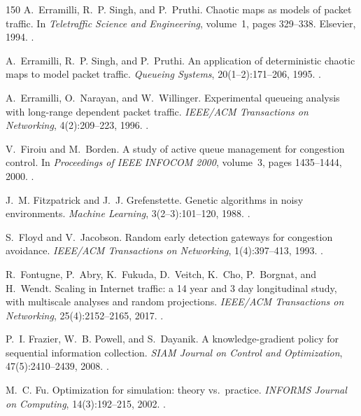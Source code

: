 \begin{thebibliography}{150}
A.~Erramilli, R.~P. Singh, and P.~Pruthi. Chaotic maps as models of packet traffic. In \emph{Teletraffic Science and Engineering}, volume~1, pages 329--338. Elsevier, 1994. .

A.~Erramilli, R.~P. Singh, and P.~Pruthi. An application of deterministic chaotic maps to model packet traffic. \emph{Queueing Systems}, 20(1--2):171--206, 1995. .

A.~Erramilli, O.~Narayan, and W.~Willinger. Experimental queueing analysis with long-range dependent packet traffic. \emph{IEEE/ACM Transactions on Networking}, 4(2):209--223, 1996. .

V.~Firoiu and M.~Borden. A study of active queue management for congestion control. In \emph{Proceedings of IEEE INFOCOM 2000}, volume~3, pages 1435--1444, 2000. .

J.~M. Fitzpatrick and J.~J. Grefenstette. Genetic algorithms in noisy environments. \emph{Machine Learning}, 3(2--3):101--120, 1988. .

S.~Floyd and V.~Jacobson. Random early detection gateways for congestion avoidance. \emph{IEEE/ACM Transactions on Networking}, 1(4):397--413, 1993. .

R.~Fontugne, P.~Abry, K.~Fukuda, D.~Veitch, K.~Cho, P.~Borgnat, and H.~Wendt. Scaling in Internet traffic: a 14 year and 3 day longitudinal study, with multiscale analyses and random projections. \emph{IEEE/ACM Transactions on Networking}, 25(4):2152--2165, 2017. .

P.~I. Frazier, W.~B. Powell, and S.~Dayanik. A knowledge-gradient policy for sequential information collection. \emph{SIAM Journal on Control and Optimization}, 47(5):2410--2439, 2008. .

M.~C. Fu. Optimization for simulation: theory vs.\ practice. \emph{INFORMS Journal on Computing}, 14(3):192--215, 2002. .


\end{thebibliography}
